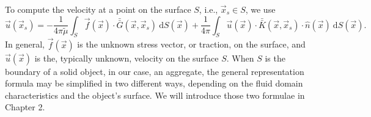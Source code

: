 To compute the velocity at a point on the surface $S$, i.e., $ \vec{x}_s \in S$, we use 
\begin{equation}
   \vec{u}(\vec{x}_s) = - \frac{1}{4 \pi {\tilde{\mu}}} \int_S  \vec{f}(\vec{x}) \cdot \bar{\bar{G}}(\vec{x},\vec{x}_s) \ \text{d}S(\vec{x}) 
+ \frac{1}{4 \pi} 
\int_S
\vec{u}(\vec{x}) \cdot  \bar{\bar{K}}(\vec{x},\vec{x}_s)  
\cdot \hat{n} ( \vec{x})
\ \text{d}S(\vec{x}).
\label{eq_BIE_onS}
\end{equation}
In general, $\vec{f}(\vec{x})$ is the unknown stress vector, or traction, on the surface, and $\vec{u}(\vec{x})$ is the, typically unknown, velocity on the surface $S$. 
When $S$ is the boundary of a solid object, in our case, an aggregate, the general representation formula may be simplified in two different ways, depending on the fluid domain characteristics and the object's surface. We will introduce those two formulae in Chapter 2. 


